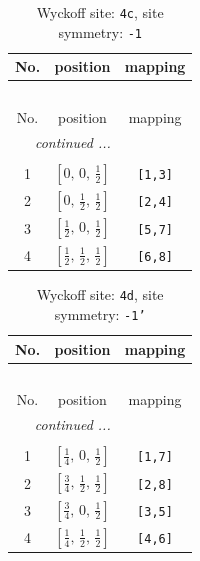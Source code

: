 \documentclass[fleqn,8pt]{jsarticle}
\begin{document}
\renewcommand{\arraystretch}{1.2}
\begin{longtable}{ccc}
\caption{Wyckoff site: {\tt 4c}, site symmetry: {\tt -1}}
 \\
 \hline \hline
No. & position & mapping \\ \hline \endfirsthead

\multicolumn{2}{l}{\tablename\ \thetable{}} \\
 \hline \hline
No. & position & mapping \\ \hline \endhead

 \hline \hline
\multicolumn{2}{r}{\footnotesize\it continued ...} \\ \endfoot

 \hline \hline
\multicolumn{2}{r}{} \\ \endlastfoot

1 & $\left[ 0,\, 0,\, \frac{1}{2} \right]$ & {\tt [1,3]} \\ \hline
2 & $\left[ 0,\, \frac{1}{2},\, \frac{1}{2} \right]$ & {\tt [2,4]} \\ \hline
3 & $\left[ \frac{1}{2},\, 0,\, \frac{1}{2} \right]$ & {\tt [5,7]} \\ \hline
4 & $\left[ \frac{1}{2},\, \frac{1}{2},\, \frac{1}{2} \right]$ & {\tt [6,8]} \\
\end{longtable}
\renewcommand{\arraystretch}{1.2}
\begin{longtable}{ccc}
\caption{Wyckoff site: {\tt 4d}, site symmetry: {\tt -1'}}
 \\
 \hline \hline
No. & position & mapping \\ \hline \endfirsthead

\multicolumn{2}{l}{\tablename\ \thetable{}} \\
 \hline \hline
No. & position & mapping \\ \hline \endhead

 \hline \hline
\multicolumn{2}{r}{\footnotesize\it continued ...} \\ \endfoot

 \hline \hline
\multicolumn{2}{r}{} \\ \endlastfoot

1 & $\left[ \frac{1}{4},\, 0,\, \frac{1}{2} \right]$ & {\tt [1,7]} \\ \hline
2 & $\left[ \frac{3}{4},\, \frac{1}{2},\, \frac{1}{2} \right]$ & {\tt [2,8]} \\ \hline
3 & $\left[ \frac{3}{4},\, 0,\, \frac{1}{2} \right]$ & {\tt [3,5]} \\ \hline
4 & $\left[ \frac{1}{4},\, \frac{1}{2},\, \frac{1}{2} \right]$ & {\tt [4,6]} \\
\end{longtable}
\end{document}
